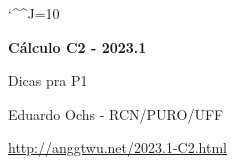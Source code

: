 \documentclass[oneside,12pt]{article}
\begin{document}

\def\drafturl{http://anggtwu.net/LATEX/2023-1-C2.pdf}
\def\drafturl{http://anggtwu.net/2023.1-C2.html}
\def\draftfooter{\tiny \href{\drafturl}{\jobname{}} \ColorBrown{\shorttoday{} \hours}}


\catcode`\^^J=10

\def\Caurl   #1{\expr{Caurl("#1")}}
\def\Cahref#1#2{\href{\Caurl{#1}}{#2}}
\def\Ca      #1{\Cahref{#1}{#1}}
\pu



%

\thispagestyle{empty}

\begin{center}

\vspace*{1.2cm}

{\bf \Large Cálculo C2 - 2023.1}

\bsk

Dicas pra P1

\bsk

Eduardo Ochs - RCN/PURO/UFF

\url{http://anggtwu.net/2023.1-C2.html}

\end{center}

\newpage

\end{document}

